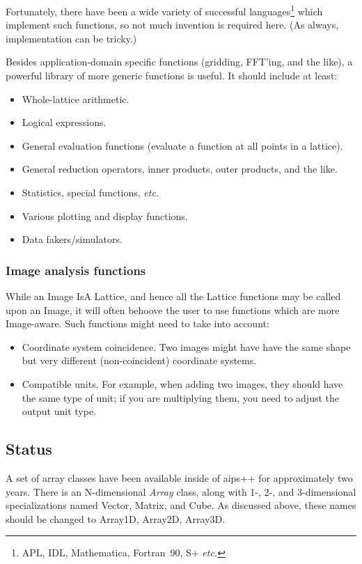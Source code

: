 Fortunately, there have been a wide variety of successful
languages\footnote{APL, IDL, Mathematica, Fortran~90, S+ {\em etc.}}
which implement such functions, so not much invention is required
here. (As always, implementation can be tricky.)

Besides application-domain specific functions (gridding, FFT'ing, and
the like), a powerful library of more generic functions is useful. It
should include at least:
\begin{itemize}
	\item Whole-lattice arithmetic.
	\item Logical expressions.
	\item General evaluation functions (evaluate a function at all
	points in a lattice).
	\item General reduction operators, inner products, outer
	products, and the like.
	\item Statistics, special functions, {\em etc.}
	\item Various plotting and display functions.
	\item Data fakers/simulators.
\end{itemize}

\subsubsection{Image analysis functions}

While an Image IsA Lattice, and hence all the Lattice functions may be
called upon an Image, it will often behoove the user to use functions
which are more Image-aware. Such functions might need to take into
account:
\begin{itemize}
	\item Coordinate system coincidence. Two images might have
	have the same shape but very different (non-coincident)
	coordinate systems. 
	\item Compatible units. For example, when adding two images, they
	should have the same type of unit; if you are multiplying them,
	you need to adjust the output unit type.
\end{itemize}


\subsection{Status}

A set of array classes have been available inside of {\sc aips++} for
approximately two years. There is an N-dimensional {\em Array} class,
along with 1-, 2-, and 3-dimensional specializations named Vector,
Matrix, and Cube. As discussed above, these names should be changed to
Array1D, Array2D, Array3D.

